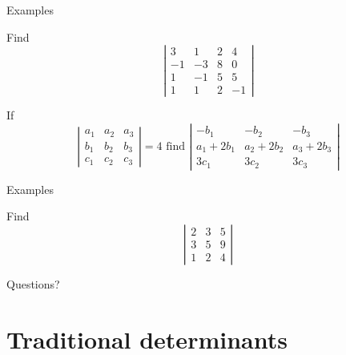 \documentclass{beamer}
\begin{document}
\begin{frame}{Examples}
  \begin{example}
    Find
    \begin{equation*}
      \left|
        \begin{array}{cccc}
          3&1&2&4\\
          -1&-3&8&0\\
          1&-1&5&5\\
          1&1&2&-1
        \end{array}
      \right|
    \end{equation*}
  \end{example}
  \begin{example}
    If
    \begin{equation*}
      \left|
        \begin{array}{ccc}
          a_1&a_2&a_3\\
          b_1&b_2&b_3\\
          c_1&c_2&c_3
        \end{array}
      \right| = 4 \text{ find }
      \left|
        \begin{array}{ccc}
          -b_1&-b_2&-b_3\\
          a_1+2b_1&a_2+2b_2&a_3+2b_3\\
          3c_1&3c_2&3c_3
        \end{array}
      \right|
    \end{equation*}
  \end{example}
\end{frame}

\begin{frame}{Examples}
  \begin{example}
    Find
    \begin{equation*}
      \left|
        \begin{array}{ccc}
          2&3&5\\
          3&5&9\\
          1&2&4
        \end{array}
      \right|
    \end{equation*}
  \end{example}
\end{frame}

\begin{frame}
  Questions?
\end{frame}

\section{Traditional determinants}
\end{document}
